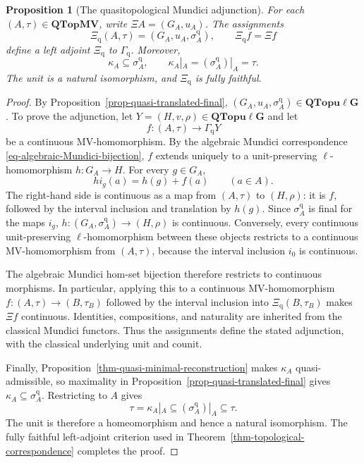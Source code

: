 \documentclass[preprint,3p]{elsarticle}
\theoremstyle{plain}
\newtheorem{prop}[thm]{Proposition}
\theoremstyle{definition}
\newcommand{\QTopMV}{\mathbf{QTopMV}}
\newcommand{\QTopulg}{\mathbf{QTopu\ell G}}
\numberwithin{equation}{section}
\begin{document}
\begin{prop}[The quasitopological Mundici adjunction]
\label{prop-quasi-adjunction}
\label{thm-quasi-exactness}
For each $(A,\tau)\in\QTopMV$, write $\Xi A=(G_A,u_A)$.
The assignments
\begin{equation}
\label{eq-Xiq-definition}
 \Xi_{\mathrm q}(A,\tau)=(G_A,u_A,\sigma_A^{\mathrm q}),
 \qquad \Xi_{\mathrm q}f=\Xi f
\end{equation}
define a left adjoint $\Xi_{\mathrm q}$ to $\Gamma_{\mathrm q}$.
Moreover,
\begin{equation}
\label{eq-quasi-exactness}
 \kappa_A\subseteq\sigma_A^{\mathrm q},
 \qquad \kappa_A|_A=(\sigma_A^{\mathrm q})|_A=\tau.
\end{equation}
The unit is a natural isomorphism, and $\Xi_{\mathrm q}$ is fully faithful.
\end{prop}

\begin{proof}
By Proposition~\ref{prop-quasi-translated-final},
$(G_A,u_A,\sigma_A^{\mathrm q})\in\QTopulg$.
To prove the adjunction, let $Y=(H,v,\rho)\in\QTopulg$ and let
\[
 f\colon(A,\tau)\longrightarrow\Gamma_{\mathrm q}Y
\]
be a continuous MV-homomorphism.
By the algebraic Mundici correspondence
\eqref{eq-algebraic-Mundici-bijection}, $f$ extends uniquely to a
unit-preserving $\ell$-homomorphism $h\colon G_A\longrightarrow H$.
For every $g\in G_A$,
\[
 h i_g(a)=h(g)+f(a)\qquad(a\in A).
\]
The right-hand side is continuous as a map from $(A,\tau)$ to
$(H,\rho)$: it is $f$, followed by the interval inclusion and
translation by $h(g)$.
Since $\sigma_A^{\mathrm q}$ is final for the maps $i_g$,
$h\colon(G_A,\sigma_A^{\mathrm q})\longrightarrow(H,\rho)$
is continuous.
Conversely, every continuous unit-preserving $\ell$-homomorphism
between these objects restricts to a continuous MV-homomorphism
from $(A,\tau)$, because the interval inclusion $i_0$ is continuous.

The algebraic Mundici hom-set bijection therefore restricts to
continuous morphisms.
In particular, applying this to a continuous MV-homomorphism
$f\colon(A,\tau)\longrightarrow(B,\tau_B)$ followed by the
interval inclusion into $\Xi_{\mathrm q}(B,\tau_B)$ makes
$\Xi f$ continuous.
Identities, compositions, and naturality are inherited from the
classical Mundici functors.  Thus the assignments define the stated
adjunction, with the classical underlying unit and counit.

Finally, Proposition~\ref{thm-quasi-minimal-reconstruction} makes
$\kappa_A$ quasi-admissible, so maximality in
Proposition~\ref{prop-quasi-translated-final} gives
$\kappa_A\subseteq\sigma_A^{\mathrm q}$.  Restricting to $A$ gives
\[
 \tau=\kappa_A|_A
 \subseteq(\sigma_A^{\mathrm q})|_A\subseteq\tau.
\]
The unit is therefore a homeomorphism and hence a natural
isomorphism.  The fully faithful left-adjoint criterion used in
Theorem~\ref{thm-topological-correspondence} completes the proof.
\end{proof}
\end{document}
